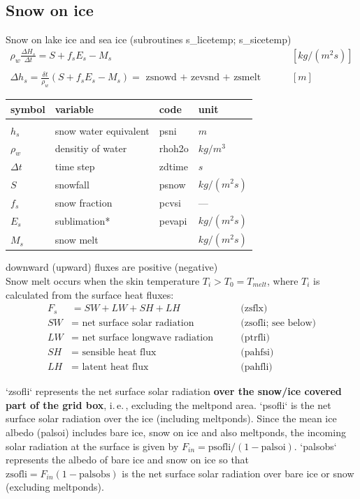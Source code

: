 \subsection{Snow on ice}
Snow on lake ice and sea ice (subroutines s\_licetemp; s\_sicetemp)
\begin{align*}
\rho_w \frac{\Delta H_s}{\Delta t}=S + f_s E_s -M_s  \qquad & [kg/(m^2 s)]\\
\\
\Delta h_s = \frac{\delta t}{\rho_w} \left (S + f_s E_s -M_s \right )= \text{ zsnowd + zevsnd + zsmelt }  \qquad & [m]
\end{align*}
\begin{tabular}{llll}
symbol & variable & code & unit\\
\hline \\
$h_s$ & snow water equivalent & psni   & $m$ \\
$\rho_w$  & densitiy of water   &   rhoh2o  & $kg/m^3$ \\
$\Delta t$  & time step           &   zdtime  & $s$ \\
$S$  & snowfall            &   psnow   & $kg/(m^2s)$ \\
$f_s$ & snow fraction       &   pcvsi  & --- \\
$E_s$ & sublimation*       &   pevapi  & $kg/(m^2s)$ \\
$M_s$ & snow melt           &          & $kg/(m^2s)$ 
\end{tabular}

\noindent *downward (upward) fluxes are positive (negative)\\

\noindent Snow melt occurs when the skin temperature $T_i>T_0=T_{melt}$, where $T_i$ is calculated from the
surface heat fluxes:\\
\begin{align*}
F_s & =  SW+LW+SH+LH       \qquad &                 \text{(zsflx)}\\
SW  & = \text{ net surface solar radiation}  \qquad &         \text{(zsofli; see below)}\\
LW  & = \text{ net surface longwave radiation}    \qquad &    \text{(ptrfli)}\\
SH  & = \text{ sensible heat flux}          \qquad &          \text{(pahfsi)}\\
LH  & = \text{ latent heat flux}           \qquad &          \text{(pahfli)}
\end{align*}

\noindent `zsofli` represents the net surface solar radiation {\bf over the snow/ice covered part of the grid
box}, i.\,e.\,, excluding the meltpond area. `psofli` is the net surface solar radiation over the ice
(including meltponds). Since the mean ice albedo (palsoi) includes bare ice, snow on ice and
also meltponds, the incoming solar radiation at the surface is given by $F_{in} = \text{psofli}/(1-\text{palsoi})$.
`palsobs` represents the albedo of bare ice and snow on ice so that $\text{zsofli} = F_{in}(1-\text{palsobs})$ is
the net surface solar radiation over bare ice or snow (excluding meltponds).\\

